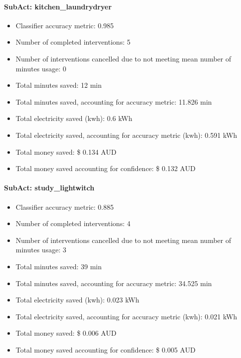 \documentclass[11pt,]{article}
\providecommand{\tightlist}{%
  \setlength{\itemsep}{0pt}\setlength{\parskip}{0pt}}
\let\oldparagraph\paragraph
\renewcommand{\paragraph}[1]{\oldparagraph{#1}\mbox{}}
\begin{document}
\hypertarget{subact-kitchen_laundrydryer}{%
\paragraph{SubAct:
kitchen\_laundrydryer}\label{subact-kitchen_laundrydryer}}

\begin{itemize}
\tightlist
\item
  Classifier accuracy metric: 0.985
\item
  Number of completed interventions: 5
\item
  Number of interventions cancelled due to not meeting mean number of
  minutes usage: 0
\item
  Total minutes saved: 12 min
\item
  Total minutes saved, accounting for accuracy metric: 11.826 min
\item
  Total electricity saved (kwh): 0.6 kWh
\item
  Total electricity saved, accounting for accuracy metric (kwh): 0.591
  kWh
\item
  Total money saved: \$ 0.134 AUD
\item
  Total money saved accounting for confidence: \$ 0.132 AUD
\end{itemize}

\hypertarget{subact-study_lightwitch}{%
\paragraph{SubAct: study\_lightwitch}\label{subact-study_lightwitch}}

\begin{itemize}
\tightlist
\item
  Classifier accuracy metric: 0.885
\item
  Number of completed interventions: 4
\item
  Number of interventions cancelled due to not meeting mean number of
  minutes usage: 3
\item
  Total minutes saved: 39 min
\item
  Total minutes saved, accounting for accuracy metric: 34.525 min
\item
  Total electricity saved (kwh): 0.023 kWh
\item
  Total electricity saved, accounting for accuracy metric (kwh): 0.021
  kWh
\item
  Total money saved: \$ 0.006 AUD
\item
  Total money saved accounting for confidence: \$ 0.005 AUD
\end{itemize}
\end{document}
